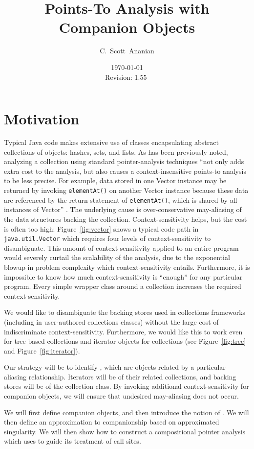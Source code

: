 \documentclass[11pt,notitlepage]{article}
\author{C.~Scott~Ananian}
\title{Points-To Analysis with Companion Objects}
\date{\today \\ $ $Revision: 1.55 $ $}
\begin{document}

\maketitle
\section{Motivation}
Typical Java code makes extensive use of classes encapsulating abstract
collections of objects: hashes, sets, and lists.  As has been
previously noted, analyzing a collection using standard pointer-analysis
techniques ``not only adds extra cost to the analysis, but also causes
a context-insensitive points-to analysis to be less precise.  For
example, data stored in one Vector instance may be returned by
invoking \texttt{elementAt()} on another Vector instance because these
data are referenced by the return statement of \texttt{elementAt()},
which is shared by all instances of Vector'' \cite[p. 75]{379676}.
The underlying cause is over-conservative may-aliasing of the data
structures backing the collection.  Context-sensitivity helps, but the
cost is often too high: Figure~\ref{fig:vector} shows a typical
code path in \texttt{java.util.Vector} which requires four levels of
context-sensitivity to disambiguate.  This amount of
context-sensitivity applied to an entire program would severely
curtail the scalability of the analysis, due to the exponential blowup
in problem complexity which context-sensitivity entails.  Furthermore,
it is impossible to know how much context-sensitivity is ``enough''
for any particular program.  Every simple wrapper class around a
collection increases the required context-sensitivity.

We would like to disambiguate the backing stores used in collections
frameworks (including in user-authored collections classes) without
the large cost of indiscriminate context-sensitivity.  Furthermore, we
would like this to work even for tree-based collections and iterator
objects for collections (see Figure~\ref{fig:tree} and
Figure~\ref{fig:iterator}).

Our strategy will be to identify , which
are objects related by a particular aliasing relationship.  Iterators
will be  of their related collections, and
backing stores will be  of the collection
class.  By invoking additional context-sensitivity for companion
objects, we will ensure that undesired may-aliasing does not occur.

We will first define companion objects, and then introduce the notion
of .  We will then define an approximation to
companionship based on approximated singularity.  We will then show
how to construct a compositional pointer analysis which uses
 to guide its treatment of call sites.
\end{document}
